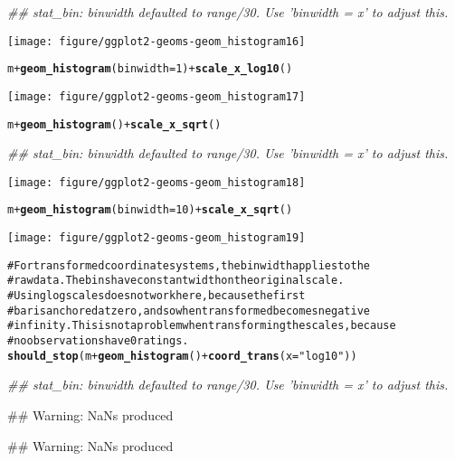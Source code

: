 \documentclass[a4paper,titlepage]{tufte-handout}\usepackage{graphicx, color}
\makeatletter
\def\maxwidth{ %
  \ifdim\Gin@nat@width>\linewidth
    \linewidth
  \else
    \Gin@nat@width
  \fi
}
\newcommand{\hlfunctioncall}[1]{\textcolor[rgb]{0.501960784313725,0,0.329411764705882}{\textbf{#1}}}%
\newcommand{\hlstring}[1]{\textcolor[rgb]{0.6,0.6,1}{#1}}%
\newcommand{\hlcomment}[1]{\textcolor[rgb]{0.180392156862745,0.6,0.341176470588235}{#1}}%
\newenvironment{kframe}{%
 \def\at@end@of@kframe{}%
 \ifinner\ifhmode%
  \def\at@end@of@kframe{\end{minipage}}%
  \begin{minipage}{\columnwidth}%
 \fi\fi%
 \def\FrameCommand##1{\hskip\@totalleftmargin \hskip-\fboxsep
 \colorbox{shadecolor}{##1}\hskip-\fboxsep
     \hskip-\linewidth \hskip-\@totalleftmargin \hskip\columnwidth}%
 \MakeFramed {\advance\hsize-\width
   \@totalleftmargin\z@ \linewidth\hsize
   \@setminipage}}%
 {\par\unskip\endMakeFramed%
 \at@end@of@kframe}
\newenvironment{knitrout}{}{} %
\makeatother
\begin{document}
\begin{knitrout}
\begin{kframe}
{\ttfamily\noindent\itshape\textcolor{messagecolor}{\#\# stat\_bin: binwidth defaulted to range/30. Use 'binwidth = x' to adjust this.}}\end{kframe}\texttt{[image: figure/ggplot2-geoms-geom\_histogram16]} \begin{kframe}\begin{alltt}
m + \hlfunctioncall{geom_histogram}(binwidth = 1) + \hlfunctioncall{scale_x_log10}()
\end{alltt}
\end{kframe}\texttt{[image: figure/ggplot2-geoms-geom\_histogram17]} \begin{kframe}\begin{alltt}
m + \hlfunctioncall{geom_histogram}() + \hlfunctioncall{scale_x_sqrt}()
\end{alltt}


{\ttfamily\noindent\itshape\textcolor{messagecolor}{\#\# stat\_bin: binwidth defaulted to range/30. Use 'binwidth = x' to adjust this.}}\end{kframe}\texttt{[image: figure/ggplot2-geoms-geom\_histogram18]} \begin{kframe}\begin{alltt}
m + \hlfunctioncall{geom_histogram}(binwidth = 10) + \hlfunctioncall{scale_x_sqrt}()
\end{alltt}
\end{kframe}\texttt{[image: figure/ggplot2-geoms-geom\_histogram19]} \begin{kframe}\begin{alltt}
\hlcomment{# For transformed coordinate systems, the binwidth applies to the}
\hlcomment{# raw data.  The bins have constant width on the original scale.}
\hlcomment{# Using log scales does not work here, because the first}
\hlcomment{# bar is anchored at zero, and so when transformed becomes negative}
\hlcomment{# infinity.  This is not a problem when transforming the scales, because}
\hlcomment{# no observations have 0 ratings.}
\hlfunctioncall{should_stop}(m + \hlfunctioncall{geom_histogram}() + \hlfunctioncall{coord_trans}(x = \hlstring{"log10"}))
\end{alltt}


{\ttfamily\noindent\itshape\textcolor{messagecolor}{\#\# stat\_bin: binwidth defaulted to range/30. Use 'binwidth = x' to adjust this.}}

{\ttfamily\noindent\textcolor{warningcolor}{\#\# Warning: NaNs produced}}

{\ttfamily\noindent\textcolor{warningcolor}{\#\# Warning: NaNs produced}}


\end{kframe}
\end{knitrout}
\end{document}

